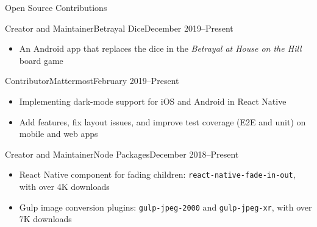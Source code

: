 \documentclass[]{mcdowellcv}
\begin{document}
	\begin{cvsection}{Open Source Contributions}
		\begin{cvsubsection}{Creator and Maintainer}{Betrayal Dice}{December 2019--Present}
			\begin{itemize}
				\item An Android app that replaces the dice in the \textit{Betrayal at House on the Hill} board game
			\end{itemize}
		\end{cvsubsection}		

		\begin{cvsubsection}{Contributor}{Mattermost}{February 2019--Present}
			\begin{itemize}
				\item Implementing dark-mode support for iOS and Android in React Native
				\item Add features, fix layout issues, and improve test coverage (E2E and unit) on mobile and web apps
			\end{itemize}
		\end{cvsubsection}

		\begin{cvsubsection}{Creator and Maintainer}{Node Packages}{December 2018--Present}
			\begin{itemize}
				\item React Native component for fading children: \texttt{react-native-fade-in-out}, with over 4K downloads
				\item Gulp image conversion plugins: \texttt{gulp-jpeg-2000} and \texttt{gulp-jpeg-xr}, with over 7K downloads
			\end{itemize}
		\end{cvsubsection}
	\end{cvsection}
	
\end{document}
